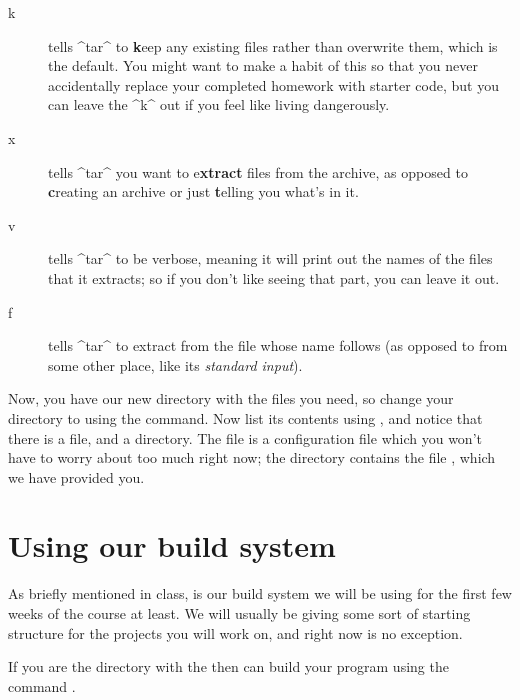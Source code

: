 \documentclass{tufte-handout}
\begin{document}
\begin{description}

  \item[k] tells ^tar^ to \textbf keep any existing files rather than
    overwrite them, which is the default. You might want to make a habit
    of this so that you never accidentally replace your completed
    homework with starter code, but you can leave the ^k^ out if you
    feel like living dangerously.

  \item[x] tells ^tar^ you want to e\textbf{xtract} files from the
    archive, as opposed to \textbf creating an archive or just \textbf
    telling you what's in it.

  \item[v] tells ^tar^ to be verbose, meaning it will print out the
    names of the files that it extracts; so if you don’t like seeing
    that part, you can leave it out.

  \item[f] tells ^tar^ to extract from the file whose name follows (as
    opposed to from some other place, like its \emph{standard input}).

\end{description}

Now, you have our new directory with the files you need, so change your
directory to  using the  command.
Now list its contents using , and notice that there is a
 file, and a  directory. The
 file is a  configuration file which
you won't have to worry about too much right now; the 
directory contains the file , which we have provided
you.

\section{Using our build system}

As briefly mentioned in class,  is our build system we
will be using for the first few weeks of the course at least.  We will
usually be giving some sort of starting structure for the projects you
will work on, and right now is no exception.

If you are the directory with the 
then can build your program using the command .
\end{document}
